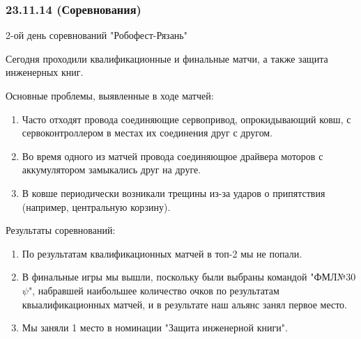 \subsubsection{23.11.14 (Соревнования)}
\begin{center}
	2-ой день соревнований "Робофест-Рязань"
\end{center}
Сегодня проходили квалификационные и финальные матчи, а также защита инженерных книг.
\newline 

Основные проблемы, выявленные в ходе матчей:
\begin{enumerate}
	\item Часто отходят провода соединяющие сервопривод, опрокидывающий ковш, с сервоконтроллером в местах их соединения друг с другом.
	
	\item Во время одного из матчей провода соединяющюе драйвера моторов с аккумулятором замыкались друг на друге.
	
	\item В ковше периодически возникали трещины из-за ударов о припятствия (например, центральную корзину).
	
\end{enumerate}

Результаты соревнований:
\begin{enumerate}
	\item По результатам квалификационных матчей в топ-2 мы не попали.
	
	\item В финальные игры мы вышли, поскольку были выбраны командой "ФМЛ№30 ${\psi}$", набравшей наибольшее количество очков по результатам квыалификационных матчей, и в результате наш альянс занял первое место.
	
	\item Мы заняли 1 место в номинации "Защита инженерной книги".
\end{enumerate}

